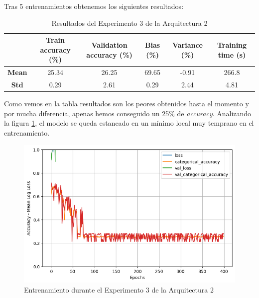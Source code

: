 \documentclass{article}
\begin{document}
			\newpage
			Tras 5 entrenamientos obtenemos los siguientes resultados:
			
			\begin{table}[!h]
				\begin{center}
					\begin{tabular}{ c | c | c | c | c | c |}
						\ & \textbf{Train accuracy (\%)} & \textbf{Validation accuracy (\%)} & \textbf{Bias (\%)} & \textbf{Variance (\%)} & \textbf{Training time (s)} \\ \hline
						\textbf{Mean} & 25.34 & 26.25 & 69.65 & -0.91 & 266.8 \\ \hline
						\textbf{Std} & 0.29 & 2.61 & 0.29 & 2.44 & 4.81 \\ \hline
					\end{tabular}
					\caption{Resultados del Experimento 3 de la Arquitectura 2}
					\label{tab:res-a2-e3}
				\end{center}
			\end{table}
			
			Como vemos en la tabla resultados son los peores obtenidos hasta el momento y por mucha diferencia, apenas hemos conseguido un 25\% de \textit{accuracy}. Analizando la figura \ref{tr-a2-e3}, el modelo se queda estancado en un m\'inimo local muy temprano en el entrenamiento.
			\begin{figure}[!h]
				\begin{center}
					\includegraphics[scale=0.5]{tr-a2-e3.png}		
					\caption{Entrenamiento durante el Experimento 3 de la Arquitectura 2}	
					\label{tr-a2-e3}
				\end{center}
			\end{figure}
			
\end{document}
